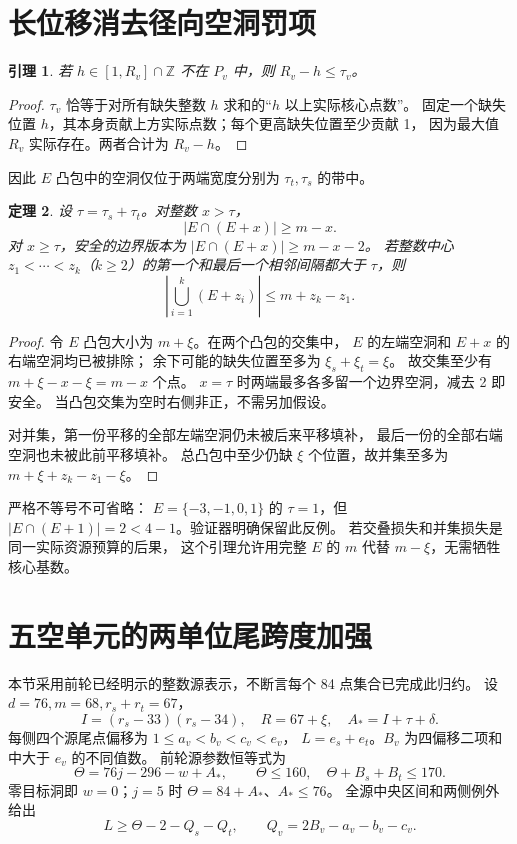\documentclass[11pt,a4paper]{article}
\newcommand{\Z}{\mathbb Z}
\newcommand{\A}{A_*}
\newtheorem{theorem}{定理}[section]
\newtheorem{lemma}[theorem]{引理}
\begin{document}
\section{长位移消去径向空洞罚项}
\begin{lemma}\label{lem:holes}
若 $h\in[1,R_v]\cap\Z$ 不在 $P_v$ 中，则 $R_v-h\le\tau_v$。
\end{lemma}
\begin{proof}
$\tau_v$ 恰等于对所有缺失整数 $h$ 求和的“$h$ 以上实际核心点数”。
固定一个缺失位置 $h$，其本身贡献上方实际点数；每个更高缺失位置至少贡献 1，
因为最大值 $R_v$ 实际存在。两者合计为 $R_v-h$。
\end{proof}
因此 $E$ 凸包中的空洞仅位于两端宽度分别为 $\tau_t,\tau_s$ 的带中。
\begin{theorem}\label{thm:longgap}
设 $\tau=\tau_s+\tau_t$。对整数 $x>\tau$，
\[|E\cap(E+x)|\ge m-x.\]
对 $x\ge\tau$，安全的边界版本为
$|E\cap(E+x)|\ge m-x-2$。
若整数中心 $z_1<\cdots<z_k$（$k\ge2$）的第一个和最后一个相邻间隔都大于 $\tau$，则
\[\left|\bigcup_{i=1}^k(E+z_i)\right|\le m+z_k-z_1.\]
\end{theorem}
\begin{proof}
令 $E$ 凸包大小为 $m+\xi$。在两个凸包的交集中，
$E$ 的左端空洞和 $E+x$ 的右端空洞均已被排除；
余下可能的缺失位置至多为 $\xi_s+\xi_t=\xi$。
故交集至少有 $m+\xi-x-\xi=m-x$ 个点。
$x=\tau$ 时两端最多各多留一个边界空洞，减去 2 即安全。
当凸包交集为空时右侧非正，不需另加假设。

对并集，第一份平移的全部左端空洞仍未被后来平移填补，
最后一份的全部右端空洞也未被此前平移填补。
总凸包中至少仍缺 $\xi$ 个位置，故并集至多为
$m+\xi+z_k-z_1-\xi$。
\end{proof}
严格不等号不可省略：
$E=\{-3,-1,0,1\}$ 的 $\tau=1$，但
$|E\cap(E+1)|=2<4-1$。验证器明确保留此反例。
若交叠损失和并集损失是同一实际资源预算的后果，
这个引理允许用完整 $E$ 的 $m$ 代替 $m-\xi$，无需牺牲核心基数。

\section{五空单元的两单位尾跨度加强}
本节采用前轮已经明示的整数源表示，不断言每个 84 点集合已完成此归约。
设 $d=76,m=68,r_s+r_t=67$，
\[
I=(r_s-33)(r_s-34),\quad R=67+\xi,\quad
\A=I+\tau+\delta.
\]
每侧四个源尾点偏移为 $1\le a_v<b_v<c_v<e_v$，
$L=e_s+e_t$。$B_v$ 为四偏移二项和中大于 $e_v$ 的不同值数。
前轮源参数恒等式为
\[\Theta=76j-296-w+\A,\qquad \Theta\le160,\quad
\Theta+B_s+B_t\le170.\]
零目标洞即 $w=0$；$j=5$ 时 $\Theta=84+\A$、$\A\le76$。
全源中央区间和两侧例外给出
\begin{equation}\label{eq:LQ}
L\ge\Theta-2-Q_s-Q_t,\qquad Q_v=2B_v-a_v-b_v-c_v.
\end{equation}
\end{document}
